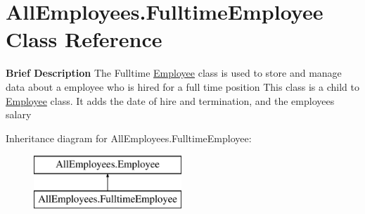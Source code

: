 \hypertarget{class_all_employees_1_1_fulltime_employee}{}\section{All\+Employees.\+Fulltime\+Employee Class Reference}
\label{class_all_employees_1_1_fulltime_employee}


{\bfseries Brief Description} The Fulltime \hyperlink{class_all_employees_1_1_employee}{Employee} class is used to store and manage data about a employee who is hired for a full time position This class is a child to \hyperlink{class_all_employees_1_1_employee}{Employee} class. It adds the date of hire and termination, and the employees salary  


Inheritance diagram for All\+Employees.\+Fulltime\+Employee\+:\begin{figure}[H]
\begin{center}
\leavevmode
\includegraphics[height=2.000000cm]{class_all_employees_1_1_fulltime_employee}
\end{center}
\end{figure}
